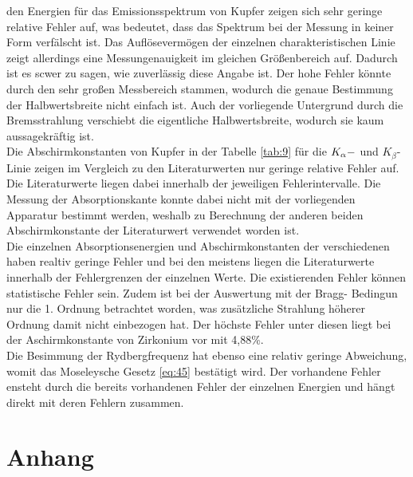 \justifying den Energien für das Emissionsspektrum von Kupfer zeigen sich sehr geringe relative Fehler
auf, was bedeutet, dass das Spektrum bei der Messung in keiner Form verfälscht ist.
Das Auflösevermögen der einzelnen charakteristischen Linie zeigt allerdings eine
Messungenauigkeit im gleichen Größenbereich  auf. Dadurch ist es scwer zu sagen,
wie zuverlässig diese Angabe ist. Der hohe Fehler könnte durch den sehr großen 
Messbereich stammen, wodurch die genaue Bestimmung der Halbwertsbreite nicht
einfach ist. Auch der vorliegende Untergrund durch die Bremsstrahlung 
verschiebt die eigentliche Halbwertsbreite, wodurch sie kaum
aussagekräftig ist.\\ 
Die Abschirmkonstanten von Kupfer in der Tabelle \ref{tab:9} für die $K_{\alpha}\-- $
und $K_{\beta} $-Linie zeigen im Vergleich zu den Literaturwerten nur geringe relative
Fehler auf. Die Literaturwerte liegen dabei innerhalb der jeweiligen Fehlerintervalle.
Die Messung der Absorptionskante konnte dabei nicht mit der vorliegenden Apparatur
bestimmt werden, weshalb zu Berechnung der anderen beiden Abschirmkonstante der 
Literaturwert verwendet worden ist.\\
Die einzelnen Absorptionsenergien und Abschirmkonstanten der verschiedenen haben
realtiv geringe Fehler und bei den meistens liegen die Literaturwerte innerhalb
der Fehlergrenzen der einzelnen Werte. Die existierenden Fehler können 
statistische Fehler sein. Zudem ist bei der Auswertung mit der Bragg-
Bedingun nur die 1. Ordnung betrachtet worden, was zusätzliche
Strahlung höherer Ordnung damit nicht einbezogen hat.
Der höchste Fehler unter diesen
liegt bei der Aschirmkonstante von Zirkonium vor mit 4,88\%. \\
Die Besimmung der Rydbergfrequenz hat ebenso eine relativ geringe Abweichung,
womit das Moseleysche Gesetz \eqref{eq:45} bestätigt wird. Der vorhandene
Fehler ensteht durch die bereits vorhandenen Fehler der einzelnen Energien und
hängt direkt mit deren Fehlern zusammen.



\newpage
\printbibliography
\newpage
\section*{Anhang}

